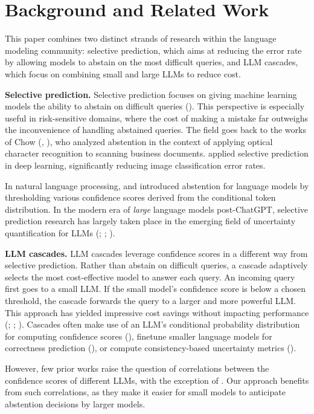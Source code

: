 \section{Background and Related Work}
This paper combines two distinct strands of research within the language modeling community: selective prediction, which aims at reducing the error rate by allowing models to abstain on the most difficult queries, and LLM cascades, which focus on combining small and large LLMs to reduce cost.

\noindent \textbf{Selective prediction.} Selective prediction focuses on giving machine learning models the ability to abstain on difficult queries (\cite{elyaniv2010}). This perspective is especially useful in risk-sensitive domains, where the cost of making a mistake far outweighs the inconvenience of handling abstained queries. The field goes back to the works of Chow (\cite{chow1957}, \cite{chow1970}), who analyzed abstention in the context of applying optical character recognition to scanning business documents. \cite{geifman2017} applied selective prediction in deep learning, significantly reducing image classification error rates.

In natural language processing, \cite{xin2021} and \cite{yoshikawa2023} introduced abstention for language models by thresholding various confidence scores derived from the conditional token distribution. In the modern era of \textit{large} language models post-ChatGPT, selective prediction research has largely taken place in the emerging field of uncertainty quantification for LLMs (\citealp{manakul2023}; \citealp{farquhar2024}; \citealp{lin2024}). 


\noindent \textbf{LLM cascades.} LLM cascades leverage confidence scores in a different way from selective prediction. Rather than abstain on difficult queries, a cascade adaptively selects the most cost-effective model to answer each query. An incoming query first goes to a small LLM. If the small model's confidence score is below a chosen threshold, the cascade forwards the query to a larger and more powerful LLM. This approach has yielded impressive cost savings without impacting performance (\citealp{chen2023}; \cite{madaan2024}; \citealp{yue2024}). Cascades often make use of an LLM's conditional probability distribution for computing confidence scores (\citealp{jitkrittum2024}), finetune smaller language models for correctness prediction (\citealp{chen2023}), or compute consistency-based uncertainty metrics (\citealp{yue2024}).

However, few prior works raise the question of correlations between the confidence scores of different LLMs, with the exception of \cite{zellinger2025}. Our approach benefits from such correlations, as they make it easier for small models to anticipate abstention decisions by larger models.